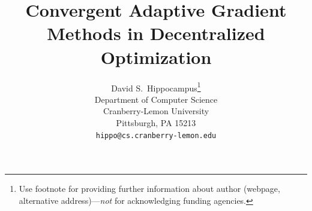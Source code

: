\documentclass{article} %
\title{Convergent Adaptive Gradient Methods in Decentralized Optimization\vspace{-0.15in}}
\begin{document}
\maketitle


\author{%
  David S.~Hippocampus\thanks{Use footnote for providing further information
    about author (webpage, alternative address)---\emph{not} for acknowledging
    funding agencies.} \\
  Department of Computer Science\\
  Cranberry-Lemon University\\
  Pittsburgh, PA 15213 \\
  \texttt{hippo@cs.cranberry-lemon.edu} \\
}
\end{document}
